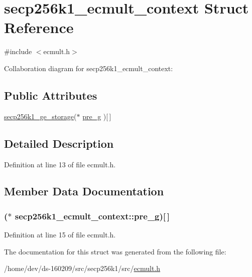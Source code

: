 \hypertarget{structsecp256k1__ecmult__context}{}\section{secp256k1\+\_\+ecmult\+\_\+context Struct Reference}
\label{structsecp256k1__ecmult__context}


{\ttfamily \#include $<$ecmult.\+h$>$}



Collaboration diagram for secp256k1\+\_\+ecmult\+\_\+context\+:
\subsection*{Public Attributes}
\begin{DoxyCompactItemize}
\item 
\hyperlink{structsecp256k1__ge__storage}{secp256k1\+\_\+ge\+\_\+storage}($\ast$ \hyperlink{structsecp256k1__ecmult__context_ac517c6e7e4f131328f395123fe4cb536}{pre\+\_\+g} )\mbox{[}$\,$\mbox{]}
\end{DoxyCompactItemize}


\subsection{Detailed Description}


Definition at line 13 of file ecmult.\+h.



\subsection{Member Data Documentation}
\hypertarget{structsecp256k1__ecmult__context_ac517c6e7e4f131328f395123fe4cb536}{}
\subsubsection[{pre\+\_\+g}]{($\ast$ secp256k1\+\_\+ecmult\+\_\+context\+::pre\+\_\+g)\mbox{[}$\,$\mbox{]}}\label{structsecp256k1__ecmult__context_ac517c6e7e4f131328f395123fe4cb536}


Definition at line 15 of file ecmult.\+h.



The documentation for this struct was generated from the following file\+:\begin{DoxyCompactItemize}
\item 
/home/dev/ds-\/160209/src/secp256k1/src/\hyperlink{ecmult_8h}{ecmult.\+h}\end{DoxyCompactItemize}
